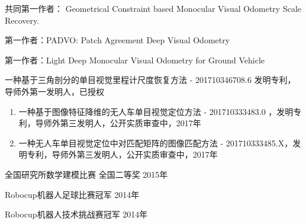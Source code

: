 \begin{enumerate}[{[}1{]}]
  \item 共同第一作者： Geometrical Constraint based Monocular Visual Odometry Scale Recovery.
  \item 第一作者：PADVO: Patch Agreement Deep Visual Odometry %
  \item 第一作者：Light Deep Monocular Visual Odometry for Ground Vehicle
\end{enumerate}
\begin{enumerate}[{[}1{]}]
\item 一种基于三角剖分的单目视觉里程计尺度恢复方法 - 201710346708.6 发明专利，导师外第一发明人，已授权 
\end{enumerate}
\begin{enumerate}
  \item 一种基于图像特征降维的无人车单目视觉定位方法 - 201710333483.0 ，发明专利，导师外第三发明人，公开实质审查中，2017年
  \item 一种无人车单目视觉定位中对匹配矩阵的图像匹配方法 - 201710333485.X，发明专利，导师外第三发明人，公开实质审查中，2017年
\end{enumerate}

\begin{enumerate}[{[}1{]}]
\item 全国研究所数学建模比赛 全国二等奖 2015年 
\item Robocup机器人足球比赛冠军  2014年
\item Robocup机器人技术挑战赛冠军 2014年
\end{enumerate}

